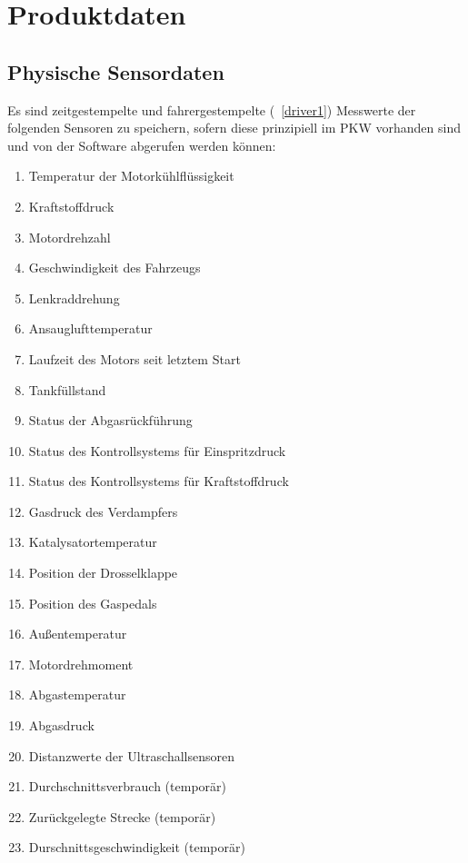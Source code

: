 \documentclass[pflichtenheft.tex]{subfiles}
\begin{document}
\chapter{Produktdaten}

\renewcommand{\theenumi}{/PD\ifnum \value{enumi}<10 0\fi\arabic{enumi}0/}
\renewcommand{\labelenumi}{\theenumi}
\renewcommand{\theenumii}{\arabic{enumii}}
\renewcommand{\labelenumii}{PD\ifnum \value{enumi}<10 0\fi\arabic{enumi}\arabic{enumii}/}

\section{Physische Sensordaten}
Es sind zeitgestempelte und fahrergestempelte (~\ref{driver1}) Messwerte der folgenden Sensoren zu speichern, sofern diese prinzipiell im PKW vorhanden sind und von der Software abgerufen werden können:
\begin{enumerate}
\item
Temperatur der Motorkühlflüssigkeit
\item
Kraftstoffdruck
\item
Motordrehzahl
\item
Geschwindigkeit des Fahrzeugs
\item
Lenkraddrehung
\item
Ansauglufttemperatur 
\item
Laufzeit des Motors seit letztem Start
\item
Tankfüllstand
\item
Status der Abgasrückführung
\item
Status des Kontrollsystems für Einspritzdruck
\item
Status des Kontrollsystems für Kraftstoffdruck
\item
Gasdruck des Verdampfers
\item
Katalysatortemperatur
\item
Position der Drosselklappe
\item
Position des Gaspedals
\item
Außentemperatur
\item
Motordrehmoment
\item
Abgastemperatur
\item
Abgasdruck
\item
Distanzwerte der Ultraschallsensoren
\item Durchschnittsverbrauch (temporär)
\item Zurückgelegte Strecke (temporär)
\item Durschnittsgeschwindigkeit (temporär)
\setcounter{enumTemp}{\value{enumi}}
\end{enumerate}
\end{document}
